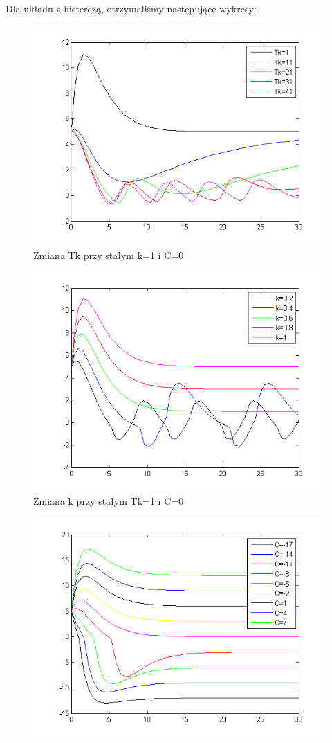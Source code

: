 \documentclass[a4paper,10pt]{article}
\begin{document}
\begin{enumerate}
Dla układu z histerezą, otrzymaliśmy następujące wykresy:
\begin{figure}[!h]
    \centering
	\includegraphics[width=120mm]{CW3-korekcja-dwupolozeniowy-e_Tk.png}
	\caption{Zmiana Tk przy stałym k=1 i C=0}
    \label{fig:Rysunek}
\end{figure}
\begin{figure}[!h]
    \centering
	\includegraphics[width=120mm]{CW3-korekcja-dwupolozeniowy-e_k.png}
	\caption{Zmiana k przy stałym Tk=1 i C=0}
    \label{fig:Rysunek}
\end{figure}
\begin{figure}[!h]
    \centering
	\includegraphics[width=120mm]{CW3-korekcja-dwupolozeniowy-e_C_k1T1.png}

\end{figure}
\end{enumerate}
\end{document}
